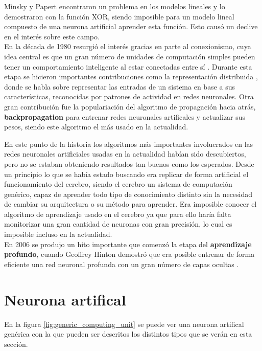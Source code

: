 Minsky y Papert encontraron un problema en los modelos lineales y lo demostraron con la función XOR, siendo imposible para un modelo lineal compuesto de una neurona artificial aprender esta función. Esto causó un declive en el interés sobre este campo.\\

En la década de 1980 resurgió el interés gracias en parte al conexionismo, cuya idea central es que un gran número de unidades de computación simples pueden tener un comportamiento inteligente al estar conectadas entre sí \cite[p16]{Goodfellow2016}. Durante esta etapa se hicieron importantes contribuciones como la representación distribuida \cite{Hinton1986}, donde se habla sobre representar las entradas de un sistema en base a sus características, reconocidas por patrones de actividad en redes neuronales. Otra gran contribución fue la populariación del algoritmo de propagación hacia atrás, \textbf{ backpropagation} \cite{Rumelhart1986} para entrenar redes neuronales artificales y actualizar sus pesos, siendo este algoritmo el más usado en la actualidad. 

En este punto de la historia los algoritmos más importantes involucrados en las redes neuronales artificiales usadas en la actualidad habían sido descubiertos, pero no se estaban obteniendo resultados tan buenos como los esperados. Desde un principio lo que se había estado buscando era replicar de forma artificial el funcionamiento del cerebro, siendo el cerebro un sistema de computación genérico, capaz de aprender todo tipo de conocimiento distinto sin la necesidad de cambiar su arquitectura o su método para aprender. Era imposible conocer el algoritmo de aprendizaje usado en el cerebro ya que para ello haría falta monitorizar una gran cantidad de neuronas con gran precisión, lo cual es imposible incluso en la actualidad.\\

En 2006 se produjo un hito importante que comenzó la etapa del \textbf{aprendizaje profundo}, cuando Geoﬀrey Hinton demostró que era posible entrenar de forma eficiente una red neuronal profunda con un gran número de capas ocultas \cite{Hinton2006}.

\section{Neurona artifical}\label{subsec:neurona_artificial}

En la figura \ref{fig:generic_computing_unit} se puede ver una neurona artifical genérica con la que pueden ser descritos los distintos tipos que se verán en esta sección.

